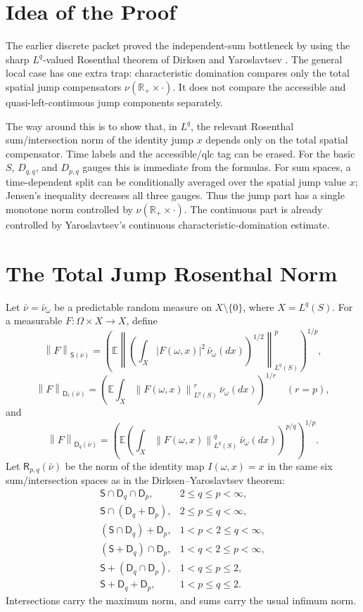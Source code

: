 \documentclass[11pt]{article}
\newcommand{\E}{\mathbb E}
\newcommand{\R}{\mathbb R}
\newcommand{\norm}[1]{\left\lVert #1\right\rVert}
\begin{document}
\section*{Idea of the Proof}

The earlier discrete packet proved the independent-sum bottleneck by using the
sharp \(L^q\)-valued Rosenthal theorem of Dirksen and Yaroslavtsev
\cite{DirksenYaroslavtsev2017}.  The general local case has one extra trap:
characteristic domination compares only the total spatial jump compensators
\(\nu(\R_+\times\cdot)\).  It does not compare the accessible and
quasi-left-continuous jump components separately.

The way around this is to show that, in \(L^q\), the relevant Rosenthal
sum/intersection norm of the identity jump \(x\) depends only on the total
spatial compensator.  Time labels and the accessible/qlc tag can be erased.
For the basic \(S\), \(D_{q,q}\), and \(D_{p,q}\) gauges this is immediate
from the formulas.  For sum spaces, a time-dependent split can be conditionally
averaged over the spatial jump value \(x\); Jensen's inequality decreases all
three gauges.  Thus the jump part has a single monotone norm controlled by
\(\nu(\R_+\times\cdot)\).  The continuous part is already controlled by
Yaroslavtsev's continuous characteristic-domination estimate.

\section*{The Total Jump Rosenthal Norm}

Let \(\bar\nu=\bar\nu_\omega\) be a predictable random measure on
\(X\setminus\{0\}\), where \(X=L^q(S)\).  For a measurable
\(F:\Omega\times X\to X\), define
\[
  \norm{F}_{\mathsf S(\bar\nu)}
  =
  \left(
  \E \left\|
      \left(\int_X |F(\omega,x)|^2\,\bar\nu_\omega(dx)\right)^{1/2}
    \right\|_{L^q(S)}^p
  \right)^{1/p},
\]
\[
  \norm{F}_{\mathsf D_{r}(\bar\nu)}
  =
  \left(
  \E \int_X \norm{F(\omega,x)}_{L^q(S)}^r\,\bar\nu_\omega(dx)
  \right)^{1/r}
  \quad (r=p),
\]
and
\[
  \norm{F}_{\mathsf D_q(\bar\nu)}
  =
  \left(
  \E \left(\int_X \norm{F(\omega,x)}_{L^q(S)}^q\,\bar\nu_\omega(dx)\right)^{p/q}
  \right)^{1/p}.
\]
Let \(\mathsf R_{p,q}(\bar\nu)\) be the norm of the identity map
\(I(\omega,x)=x\) in the same six sum/intersection spaces as in the
Dirksen--Yaroslavtsev theorem:
\[
\begin{array}{ll}
\mathsf S\cap \mathsf D_q\cap \mathsf D_p, & 2\le q\le p<\infty,\\
\mathsf S\cap(\mathsf D_q+\mathsf D_p), & 2\le p\le q<\infty,\\
(\mathsf S\cap \mathsf D_q)+\mathsf D_p, & 1<p<2\le q<\infty,\\
(\mathsf S+\mathsf D_q)\cap\mathsf D_p, & 1<q<2\le p<\infty,\\
\mathsf S+(\mathsf D_q\cap\mathsf D_p), & 1<q\le p\le2,\\
\mathsf S+\mathsf D_q+\mathsf D_p, & 1<p\le q\le2.
\end{array}
\]
Intersections carry the maximum norm, and sums carry the usual infimum norm.
\end{document}
